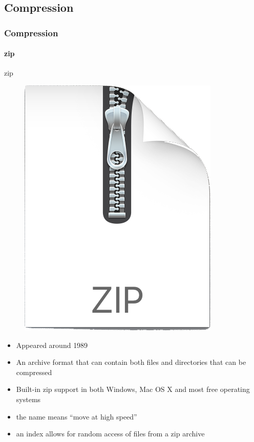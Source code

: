 \documentclass[aspectratio=169,dvipsnames]{beamer}
\begin{document}
\subsection{Compression}
    \begin{frame}
        \frametitle{Compression}
        \framesubtitle{zip}
        \begin{block}{zip}
        \begin{figure}
        \centering
        \vspace{-6pt}
        \includegraphics[width=0.55\linewidth]{Figures/zip.png}
        \end{figure}
            \mbox{}
            \begin{itemize}
                \item Appeared around \alert{1989}
                \item An archive format that \alert{can contain both files and directories} that \alert{can be compressed}
            \end{itemize}
            \mbox{}\vspace{-17pt}
            \begin{itemize}
                \item Built-in zip support in both Windows, Mac OS X and most free operating systems
                \item the name means ``move at high speed''
                \item an index allows for \alert{random access} of files from a zip archive
            \end{itemize}

        \end{block}
    \end{frame}
\end{document}
